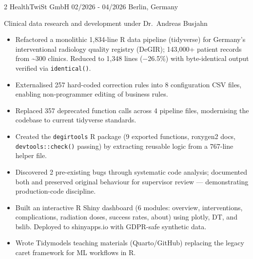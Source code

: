 \documentclass{thejus_cv}
\begin{document}
\begin{paracol}{2}
             {HealthTwiSt GmbH}
             {02/2026 - 04/2026}
             {Berlin, Germany}
             {Clinical data research and development under Dr.~Andreas Busjahn
             \begin{itemize}\setlength{\itemsep}{0.05em}
                   \item Refactored a monolithic 1,834-line R data pipeline (tidyverse) for Germany's interventional radiology quality registry (DeGIR); 143,000+ patient records from \textasciitilde300 clinics. Reduced to 1,348 lines ($-$26.5\%) with byte-identical output verified via \texttt{identical()}.
                   \item Externalised 257 hard-coded correction rules into 8 configuration CSV files, enabling non-programmer editing of business rules.
                   \item Replaced 357 deprecated function calls across 4 pipeline files, modernising the codebase to current tidyverse standards.
                   \item Created the \texttt{degirtools} R package (9 exported functions, roxygen2 docs, \texttt{devtools::check()} passing) by extracting reusable logic from a 767-line helper file.
                   \item Discovered 2 pre-existing bugs through systematic code analysis; documented both and preserved original behaviour for supervisor review --- demonstrating production-code discipline.
                   \item Built an interactive R Shiny dashboard (6 modules: overview, interventions, complications, radiation doses, success rates, about) using plotly, DT, and bslib. Deployed to shinyapps.io with GDPR-safe synthetic data.
                   \item Wrote Tidymodels teaching materials (Quarto/GitHub) replacing the legacy caret framework for ML workflows in R.
               \end{itemize}}


\end{paracol}
\end{document}
